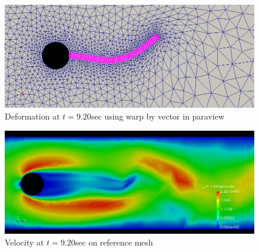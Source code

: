 \begin{figure}[H]
\caption{Deformation at $t =9.20 $sec  using warp by vector in paraview}
\includegraphics[scale=0.40,trim={0mm 0mm 0mm 0mm},clip]{./Verification_Validation/Hron_Turek/FSI2_d_920.png}
\end{figure}
\begin{figure}[H]
\caption{Velocity at $ t = 9.20 $sec on reference mesh}
\includegraphics[scale=0.40,trim={0mm 0mm 0mm 0mm},clip]{./Verification_Validation/Hron_Turek/FSI2_u_920.png}
\end{figure}










